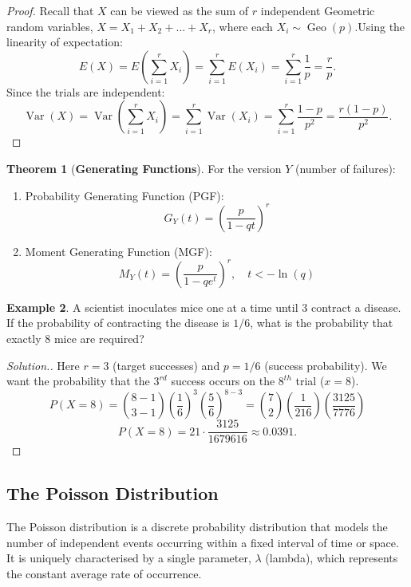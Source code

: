 \documentclass[12pt,a4paper]{report}
\theoremstyle{definition}
\newtheorem{thm}{Theorem}[section]
\newtheorem{example}[thm]{Example}
\theoremstyle{plain}
\theoremstyle{definition}
\newenvironment{solution}
  {\renewcommand{\qedsymbol}{}\begin{proof}[\textit{Solution}.]}
  {\end{proof}}
\begin{document}
\begin{proof} Recall that $X$ can be viewed as the sum of $r$ independent Geometric random variables, $X = X_1 + X_2 + \dots + X_r$, where each $X_i \sim \operatorname{Geo}(p)$.Using the linearity of expectation:\[ E(X) = E\left(\sum_{i=1}^r X_i\right) = \sum_{i=1}^r E(X_i) = \sum_{i=1}^r \frac{1}{p} = \frac{r}{p}. \]Since the trials are independent:\[ \operatorname{Var}(X) = \operatorname{Var}\left(\sum_{i=1}^r X_i\right) = \sum_{i=1}^r \operatorname{Var}(X_i) = \sum_{i=1}^r \frac{1-p}{p^2} = \frac{r(1-p)}{p^2}. \]
\end{proof}

\begin{thm}[\textbf{Generating Functions}]
For the version $Y$ (number of failures):
\begin{enumerate}
\item Probability Generating Function (PGF): \[G_Y(t) = \left( \frac{p}{1-qt} \right)^r\]
\item Moment Generating Function (MGF): \[M_Y(t) = \left( \frac{p}{1-qe^t} \right)^r, \quad t < -\ln(q)\]
\end{enumerate}
\end{thm}




\begin{example}A scientist inoculates mice one at a time until 3 contract a disease. If the probability of contracting the disease is $1/6$, what is the probability that exactly 8 mice are required?
\end{example}
\begin{solution} Here $r=3$ (target successes) and $p=1/6$ (success probability). We want the probability that the $3^{rd}$ success occurs on the $8^{th}$ trial ($x=8$).\[ P(X=8) = \binom{8-1}{3-1} \left(\frac{1}{6}\right)^3 \left(\frac{5}{6}\right)^{8-3} = \binom{7}{2} \left(\frac{1}{216}\right) \left(\frac{3125}{7776}\right) \]\[ P(X=8) = 21 \cdot \frac{3125}{1679616} \approx 0.0391. \]
\end{solution}















\subsection{The Poisson Distribution}
The Poisson distribution is a discrete probability distribution that models the number of independent events occurring within a fixed interval of time or space. It is uniquely characterised by a single parameter, $\lambda$ (lambda), which represents the constant average rate of occurrence.
\end{document}
